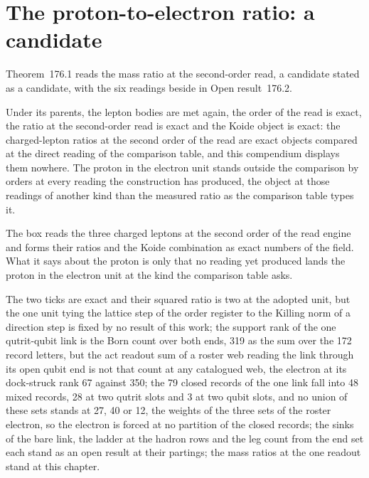 \section{The proton-to-electron ratio: a candidate}\label{mod:VII-5-proton-to-electron-ratio-a-candidate}
\label{narr:open:7-5}Theorem~176.1 reads the mass ratio at the second-order read, a candidate stated as a candidate, with the six readings beside in Open result~176.2.
\begin{chconditional}\label{box:VII-5-proton-to-electron-ratio-a-candidate:1}
Under its parents, the lepton bodies are met again, the order of the read is exact, the ratio at the second-order read is exact and the Koide object is exact: the charged-lepton ratios at the second order of the read are exact objects compared at the direct reading of the comparison table, and this compendium displays them nowhere. The proton in the electron unit stands outside the comparison by orders at every reading the construction has produced, the object at those readings of another kind than the measured ratio as the comparison table types it.
\end{chconditional}
The box reads the three charged leptons at the second order of the read engine and forms their ratios and the Koide combination as exact numbers of the field. What it says about the proton is only that no reading yet produced lands the proton in the electron unit at the kind the comparison table asks.
\begin{chwall}\label{box:VII-5-proton-to-electron-ratio-a-candidate:2}
The two ticks are exact and their squared ratio is two at the adopted unit, but the one unit tying the lattice step of the order register to the Killing norm of a direction step is fixed by no result of this work; the support rank of the one qutrit-qubit link is the Born count over both ends, 319 as the sum over the 172 record letters, but the act readout sum of a roster web reading the link through its open qubit end is not that count at any catalogued web, the electron at its dock-struck rank 67 against 350; the 79 closed records of the one link fall into 48 mixed records, 28 at two qutrit slots and 3 at two qubit slots, and no union of these sets stands at 27, 40 or 12, the weights of the three sets of the roster electron, so the electron is forced at no partition of the closed records; the sinks of the bare link, the ladder at the hadron rows and the leg count from the end set each stand as an open result at their partings; the mass ratios at the one readout stand at this chapter.
\end{chwall}
